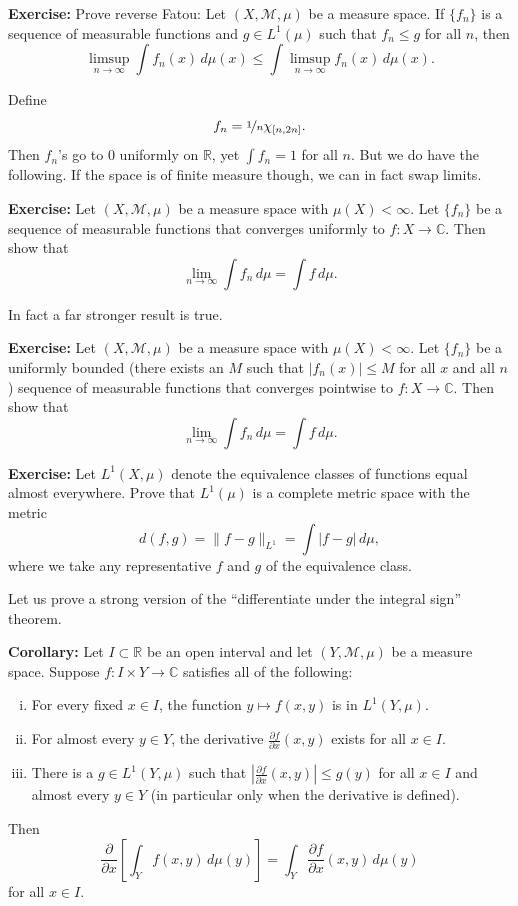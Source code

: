 \documentclass[12pt]{book}
\newcommand{\snorm}[1]{\lVert {#1} \rVert}
\newcommand{\abs}[1]{\left\lvert {#1} \right\rvert}
\newcommand{\C}{{\mathbb{C}}}
\newcommand{\R}{{\mathbb{R}}}
\newcommand{\sM}{{\mathcal{M}}}
\theoremstyle{plain}
\theoremstyle{remark}
\theoremstyle{definition}
\theoremstyle{exercise}
\theoremstyle{example}
\begin{document}
\medskip

\textbf{Exercise:}
Prove reverse Fatou:
Let $(X,\sM,\mu)$ be a measure space.
If $\{ f_n \}$ is a sequence of measurable functions and $g \in L^1(\mu)$
such that $f_n \leq g$ for all $n$, then
$$
\limsup_{n\to\infty} \int f_n(x) \, d\mu(x)  \leq
\int \limsup_{n\to\infty} f_n(x) \, d\mu(x) .
$$

\medskip

Define
$$
f_n = \nicefrac{1}{n}\chi_{[n,2n]} .
$$
Then $f_n$'s go to 0 uniformly on $\R$, yet $\int f_n = 1$ for all $n$.  But
we do have the following.  If the space is of finite measure though, we can
in fact swap limits.

\medskip

\textbf{Exercise:}
Let $(X,\sM,\mu)$ be a measure space with $\mu(X) < \infty$.
Let $\{ f_n \}$ be a sequence of measurable functions that converges
uniformly to $f \colon X \to \C$.  Then show that
$$
\lim_{n\to\infty} \int f_n \, d\mu =
\int f \, d\mu .
$$

\medskip

In fact a far stronger result is true.

\medskip

\textbf{Exercise:}
Let $(X,\sM,\mu)$ be a measure space with $\mu(X) < \infty$.
Let $\{ f_n \}$ be a uniformly bounded (there exists an $M$ such that
$\abs{f_n(x)} \leq M$ for all $x$ and all $n$) sequence of measurable
functions that converges
pointwise to $f \colon X \to \C$.  Then show that
$$
\lim_{n\to\infty} \int f_n \, d\mu =
\int f \, d\mu .
$$

\medskip

\textbf{Exercise:}
Let $L^1(X,\mu)$ denote the equivalence classes of functions equal almost
everywhere.  Prove that $L^1(\mu)$ is a complete metric space
with the metric
$$
d(f,g) = \snorm{f-g}_{L^1} = \int \abs{f-g}\, d\mu ,
$$
where we take any representative $f$ and $g$ of the equivalence class.

\medskip

Let us prove a strong version of the ``differentiate under the integral
sign'' theorem.

\medskip

\textbf{Corollary:}
Let $I \subset \R$ be an open interval and let $(Y,\sM,\mu)$ be a measure
space.
Suppose $f\colon I \times Y \to \C$ satisfies all of the following:
\begin{enumerate}[(i)]
\item
For every fixed $x \in I$, the function
$y \mapsto f(x,y)$ is in $L^1(Y,\mu)$.
\item
For almost every
$y \in Y$, the derivative $\frac{\partial f}{\partial x}(x,y)$ exists for all $x \in I$.
\item
There is a $g \in L^1(Y,\mu)$ such that
$\abs{\frac{\partial f}{\partial x}(x,y)} \leq g(y)$
for all $x \in I$ and almost every $y \in Y$ (in particular only when the
derivative is defined).
\end{enumerate}
Then 
$$
\frac{\partial}{\partial x} \left[\int_Y f(x,y) \, d\mu(y) \right] =
\int_Y \frac{\partial f}{\partial x}(x,y) \, d\mu(y)
$$
for all $x \in I$.
\end{document}
